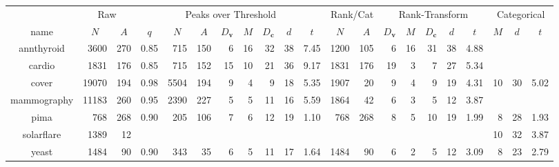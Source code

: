 \begin{tabular}{c|rr|rrrrrrrr|rr|rrrrr|rrr}
  \toprule



   
\multicolumn{1}{c}{~} & \multicolumn{2}{c}{Raw} & \multicolumn{8}{c}{Peaks over Threshold} & \multicolumn{2}{c}{Rank/Cat} & \multicolumn{5}{c}{Rank-Transform} & \multicolumn{3}{c}{Categorical} \\
\multicolumn{1}{c}{name} & \multicolumn{1}{c}{$N$} & \multicolumn{1}{c}{$A$} & \multicolumn{1}{c}{$q$} & \multicolumn{1}{c}{$N$} & \multicolumn{1}{c}{$A$} & \multicolumn{1}{c}{$D_{\bm{v}}$} & \multicolumn{1}{c}{$M$} & \multicolumn{1}{c}{$D_{\bm{c}}$} & \multicolumn{1}{c}{$d$} & \multicolumn{1}{c}{$t$} & \multicolumn{1}{c}{$N$} & \multicolumn{1}{c}{$A$} & \multicolumn{1}{c}{$D_{\bm{v}}$} & \multicolumn{1}{c}{$M$} & \multicolumn{1}{c}{$D_{\bm{c}}$} & \multicolumn{1}{c}{$d$} & \multicolumn{1}{c}{$t$}  & \multicolumn{1}{c}{$M$} & \multicolumn{1}{c}{$d$} & \multicolumn{1}{c}{$t$} \\ \hline

annthyroid  & 3600  & 270 & 0.85 & 715  & 150 &   6 &  16 &  32 &  38 & 7.45 & 1200 & 105 &   6 &  16 &  31 &  38 & 4.88 &     &     &      \\ 
cardio      & 1831  & 176 & 0.85 & 715  & 152 &  15 &  10 &  21 &  36 & 9.17 & 1831 & 176 &  19 &   3 &   7 &  27 & 5.34 &     &     &      \\ 
cover       & 19070 & 194 & 0.98 & 5504 & 194 &   9 &   4 &   9 &  18 & 5.35 & 1907 &  20 &   9 &   4 &   9 &  19 & 4.31 &  10 &  30 & 5.02 \\ 
mammography & 11183 & 260 & 0.95 & 2390 & 227 &   5 &   5 &  11 &  16 & 5.59 & 1864 &  42 &   6 &   3 &   5 &  12 & 3.87 &     &     &      \\ 
pima        & 768   & 268 & 0.90 & 205  & 106 &   7 &   6 &  12 &  19 & 1.10 & 768 & 268  &   8 &   5 &  10 &  19 & 1.99 &   8 &  28 & 1.93 \\ 
solarflare  & 1389  & 12  &      &      &     &     &     &     &     &      &     &      &     &     &     &     &      &  10 &  32 & 3.87 \\ 
yeast       & 1484  & 90  & 0.90 & 343  &  35 &   6 &   5 &  11 &  17 & 1.64 & 1484 &  90 &   6 &   2 &   5 &  12 & 3.09 &   8 &  23 & 2.79 \\ 
   \bottomrule
\end{tabular}
